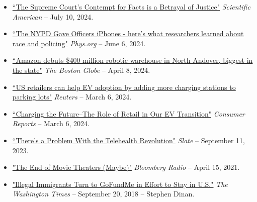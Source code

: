 \documentclass[10.5pt,letterpaper,sans]{moderncv}        %
\begin{document}
\begin{itemize}

\item \textcolor{gray}{\href{https://www.scientificamerican.com/article/the-supreme-courts-contempt-for-facts-is-a-betrayal-of-justice/}{``The Supreme Court's Contempt for Facts is a Betrayal of Justice"}} \textit{Scientific American} -- July 10, 2024.

\item \textcolor{gray}{\href{https://phys.org/news/2024-06-nypd-gave-officers-iphones-policing.html}{``The NYPD Gave Officers iPhones - here's what researchers learned about race and policing"}} \textit{Phys.org} -- June 6, 2024.

\item \textcolor{gray}{\href{https://www.bostonglobe.com/2024/04/08/business/amazon-robotics-warehouse-north-andover/}{``Amazon debuts \$400 million robotic warehouse in North Andover, biggest in the state"}} \textit{The Boston Globe} -- April 8, 2024.

\item \textcolor{gray}{\href{https://www.reuters.com/business/autos-transportation/retailers-could-help-boost-ev-charging-us-report-says-2024-03-06/}{``US retailers can help EV adoption by adding more charging stations to parking lots"}} \textit{Reuters} -- March 6, 2024.

\item \textcolor{gray}{\href{https://advocacy.consumerreports.org/research/cr-report-charging-the-future-the-role-of-retail-in-our-ev-transition/}{``Charging the Future--The Role of Retail in Our EV Transition"}} \textit{Consumer Reports} -- March 6, 2024.

\item \textcolor{gray}{\href{https://slate.com/technology/2023/09/telehealth-revolution-revenue-rural-hospitals-research.html}{``There's a Problem With the Telehealth Revolution"}} \textit{Slate} -- September 11, 2023.

\item \textcolor{gray}{\href{https://www.bloomberg.com/news/audio/2021-04-15/baystate-business-the-end-of-movie-theaters-maybe-radio}{"The End of Movie Theaters (Maybe)"}} \textit{Bloomberg Radio} -- April 15, 2021.

\item \textcolor{gray}{\href{https://www.washingtontimes.com/news/2018/sep/20/pro-trumpers-turn-gofundme-build-border-wall/}{"Illegal Immigrants Turn to GoFundMe in Effort to Stay in U.S."}} \textit{The Washington Times} -- September 20, 2018 -- Stephen Dinan.


\end{itemize}
\end{document}
